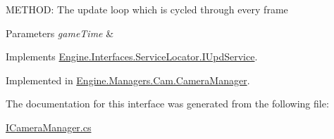 M\+E\+T\+H\+OD\+: The update loop which is cycled through every frame 


\begin{DoxyParams}{Parameters}
{\em game\+Time} & \\
\hline
\end{DoxyParams}


Implements \hyperlink{a00478_a387fce2a5440a4dc63f8d72772ecbdaa}{Engine.\+Interfaces.\+Service\+Locator.\+I\+Upd\+Service}.



Implemented in \hyperlink{a00494_a43e367859b47354445da2a304eff7ec4}{Engine.\+Managers.\+Cam.\+Camera\+Manager}.



The documentation for this interface was generated from the following file\+:\begin{DoxyCompactItemize}
\item 
\hyperlink{a00098}{I\+Camera\+Manager.\+cs}\end{DoxyCompactItemize}

